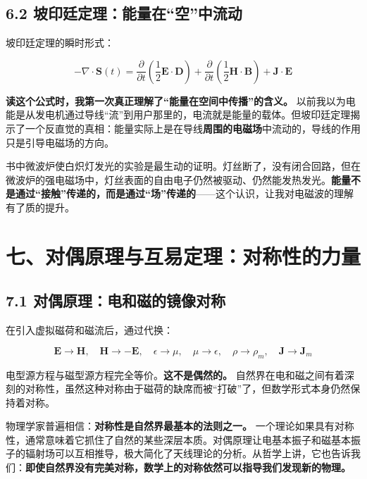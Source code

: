 \documentclass[12pt,a4paper]{ctexart}
\begin{document}
\subsection*{6.2 坡印廷定理：能量在“空”中流动}

坡印廷定理的瞬时形式：

\begin{equation}
-\nabla \cdot \mathbf{S}(t) = \frac{\partial}{\partial t}\left(\frac{1}{2}\mathbf{E}\cdot\mathbf{D}\right) + \frac{\partial}{\partial t}\left(\frac{1}{2}\mathbf{H}\cdot\mathbf{B}\right) + \mathbf{J}\cdot\mathbf{E}
\end{equation}

\textbf{读这个公式时，我第一次真正理解了“能量在空间中传播”的含义。} 以前我以为电能是从发电机通过导线“流”到用户那里的，电流就是能量的载体。但坡印廷定理揭示了一个反直觉的真相：能量实际上是在导线\textbf{周围的电磁场}中流动的，导线的作用只是引导电磁场的方向。

书中微波炉使白炽灯发光的实验是最生动的证明。灯丝断了，没有闭合回路，但在微波炉的强电磁场中，灯丝表面的自由电子仍然被驱动、仍然能发热发光。\textbf{能量不是通过“接触”传递的，而是通过“场”传递的}——这个认识，让我对电磁波的理解有了质的提升。

\section*{七、对偶原理与互易定理：对称性的力量}

\subsection*{7.1 对偶原理：电和磁的镜像对称}

在引入虚拟磁荷和磁流后，通过代换：

\begin{equation}
\mathbf{E} \to \mathbf{H},\quad \mathbf{H} \to -\mathbf{E},\quad \epsilon \to \mu,\quad \mu \to \epsilon,\quad \rho \to \rho_m,\quad \mathbf{J} \to \mathbf{J}_m
\end{equation}

电型源方程与磁型源方程完全等价。\textbf{这不是偶然的。} 自然界在电和磁之间有着深刻的对称性，虽然这种对称由于磁荷的缺席而被“打破”了，但数学形式本身仍然保持着对称。

物理学家普遍相信：\textbf{对称性是自然界最基本的法则之一。} 一个理论如果具有对称性，通常意味着它抓住了自然的某些深层本质。对偶原理让电基本振子和磁基本振子的辐射场可以互相推导，极大简化了天线理论的分析。从哲学上讲，它也告诉我们：\textbf{即使自然界没有完美对称，数学上的对称依然可以指导我们发现新的物理。}
\end{document}
